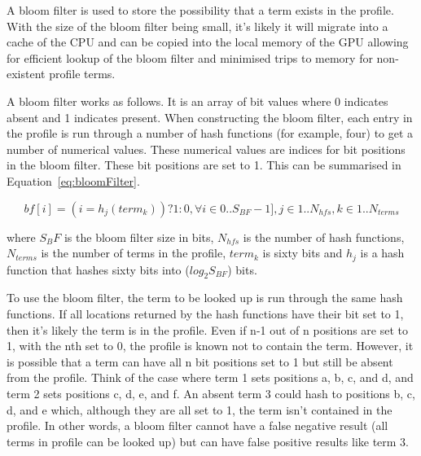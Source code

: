 A bloom filter is used to store the possibility that a term exists in the
profile. With the size of the bloom filter being small, it's likely it will
migrate into a cache of the CPU and can be copied into the local memory of the
GPU allowing for efficient lookup of the bloom filter and minimised trips to
memory for non-existent profile terms.

A bloom filter works as follows. It is an array of bit values where 0 indicates
absent and 1 indicates present. When constructing the bloom filter, each entry
in the profile is run through a number of hash functions (for example, four) to
get a number of numerical values. These numerical values are indices for bit
positions in the bloom filter. These bit positions are set to 1. This can be
summarised in Equation~\ref{eq:bloomFilter}.

\begin{equation}
\label{eq:bloomFilter}
bf[i] = (i = h_j(term_k) ) ? 1 : 0, \forall i \in 0 .. S_{BF}-1], j \in 1..N_{hfs}, k \in 1..N_{terms}
\end{equation}

where $S_BF$ is the bloom filter size in bits, $N_{hfs}$ is the number of hash
functions, $N_{terms}$ is the number of terms in the profile, $term_k$ is sixty
bits and $h_j$ is a hash function that hashes sixty bits into ($log_2 S_{BF}$)
bits.



To use the bloom filter, the term to be looked up is run through the same hash
functions. If all locations returned by the hash functions have their bit set to
1, then it's likely the term is in the profile. Even if n-1 out of n positions
are set to 1, with the nth set to 0, the profile is known not to contain the
term. However, it is possible that a term can have all n bit positions set to 1
but still be absent from the profile. Think of the case where term 1 sets
positions a, b, c, and d, and term 2 sets positions c, d, e, and f. An absent
term 3 could hash to positions b, c, d, and e which, although they are all set
to 1, the term isn't contained in the profile. In other words, a bloom filter
cannot have a false negative result (all terms in profile can be looked up) but
can have false positive results like term 3.

